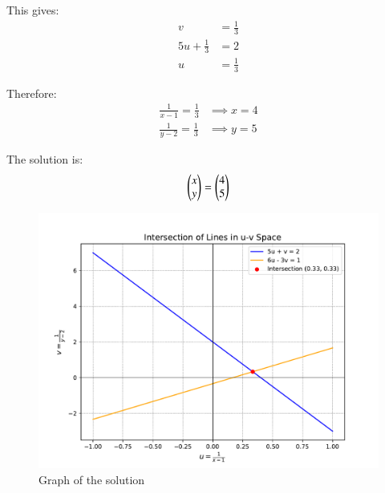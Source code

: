 \documentclass[journal]{IEEEtran}
\begin{document}
This gives:
\begin{align}
    v &= \frac{1}{3}\\
    5u + \frac{1}{3} &= 2\\
    u &= \frac{1}{3}
\end{align}

Therefore:
\begin{align}
    \frac{1}{x-1} = \frac{1}{3} &\implies x = 4\\
    \frac{1}{y-2} = \frac{1}{3} &\implies y = 5
\end{align}

The solution is:
\begin{align}
    \begin{pmatrix}x\\y\end{pmatrix} = \begin{pmatrix}4\\5\end{pmatrix}
\end{align}

\begin{figure}[h!]
   \centering
	 \includegraphics[width=\textwidth]{figs/fig.pdf}
   \caption{Graph of the solution}
\end{figure}
\end{document}
